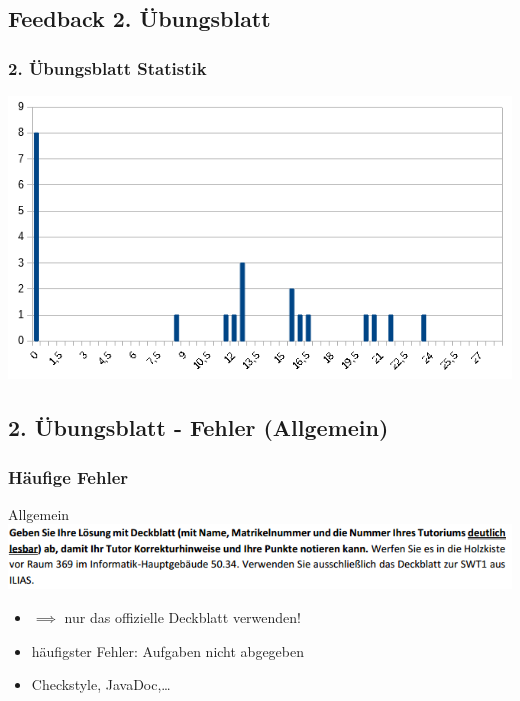 \documentclass[18pt]{beamer}
\begin{document}
\subsection{Feedback 2. Übungsblatt}
\begin{frame}
	\frametitle{2. Übungsblatt Statistik}
	\includegraphics[scale=0.7]{./pics/tut2/statistics-ub2.png}
\end{frame}
	
\subsection{2. Übungsblatt - Fehler (Allgemein)}
\begin{frame}
		\frametitle{Häufige Fehler}
		\begin{block}{Allgemein}
			\includegraphics[scale=0.6]{./pics/tut2/deckblatt.png}
			\begin{itemize}
				\item $\implies$ nur das offizielle Deckblatt verwenden!
				\pause
				\item häufigster Fehler: Aufgaben nicht abgegeben
				\item Checkstyle, JavaDoc,\dots
			\end{itemize}
		\end{block}
\end{frame}
	
\end{document}
